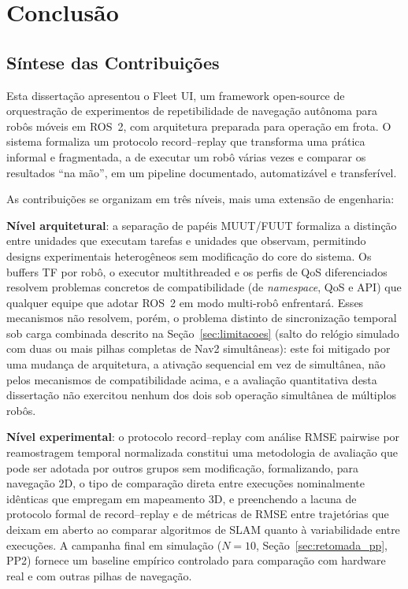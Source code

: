 \chapter{Conclusão}
\label{chap:conclusao}

\section{Síntese das Contribuições}
\label{sec:sintese}

Esta dissertação apresentou o Fleet UI, um framework open-source de orquestração
de experimentos de repetibilidade de navegação autônoma para robôs móveis em
ROS~2, com arquitetura preparada para operação em frota. O sistema formaliza um
protocolo record--replay que transforma uma prática informal e fragmentada, a
de executar um robô várias vezes e comparar os resultados ``na mão'', em um
pipeline documentado, automatizável e transferível.

As contribuições se organizam em três níveis, mais uma extensão de engenharia:

\textbf{Nível arquitetural}: a separação de papéis MUUT/FUUT formaliza a distinção
entre unidades que executam tarefas e unidades que observam, permitindo designs
experimentais heterogêneos sem modificação do core do sistema. Os buffers TF por
robô, o executor multithreaded e os perfis de QoS diferenciados resolvem problemas
concretos de compatibilidade (de \textit{namespace}, QoS e API) que qualquer
equipe que adotar ROS~2 em modo multi-robô enfrentará. Esses mecanismos não
resolvem, porém, o problema distinto de sincronização temporal sob carga combinada
descrito na Seção~\ref{sec:limitacoes} (salto do relógio simulado com duas ou mais
pilhas completas de Nav2 simultâneas): este foi mitigado por uma mudança de
arquitetura, a ativação sequencial em vez de simultânea, não pelos mecanismos
de compatibilidade acima, e a avaliação quantitativa desta dissertação não
exercitou nenhum dos dois sob operação simultânea de múltiplos robôs.

\textbf{Nível experimental}: o protocolo record--replay com análise RMSE pairwise
por reamostragem temporal normalizada constitui uma metodologia de avaliação que
pode ser adotada por outros grupos sem modificação, formalizando, para
navegação 2D, o tipo de comparação direta entre execuções nominalmente
idênticas que  empregam em mapeamento 3D, e preenchendo a
lacuna de protocolo formal de record--replay e de métricas de RMSE entre
trajetórias que  deixam em aberto ao comparar algoritmos
de SLAM quanto à variabilidade entre execuções. A campanha final em
simulação ($N=10$, Seção~\ref{sec:retomada_pp}, PP2) fornece um baseline
empírico controlado para comparação com hardware real e com outras pilhas de
navegação.

